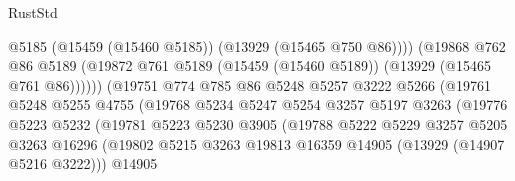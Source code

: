 \begin{lexlean}{RustStd}
\begin{coremodule}
                                          @5185
                                          (@15459 (@15460 @5185))
                                          (@13929 (@15465 @750 @86))))
                                      (@19868
                                        @762
                                        @86
                                        @5189
                                        (@19872
                                          @761
                                          @5189
                                          (@15459 (@15460 @5189))
                                          (@13929 (@15465 @761 @86))))))
                                  (@19751
                                    @774
                                    @785
                                    @86
                                    @5248
                                    @5257
                                    @3222
                                    @5266
                                    (@19761
                                      @5248
                                      @5255
                                      @4755
                                      (@19768
                                        @5234
                                        @5247
                                        @5254
                                        @3257
                                        @5197
                                        @3263
                                        (@19776
                                          @5223
                                          @5232
                                          (@19781
                                            @5223
                                            @5230
                                            @3905
                                            (@19788
                                              @5222
                                              @5229
                                              @3257
                                              @5205
                                              @3263
                                              @16296
                                              (@19802
                                                @5215
                                                @3263
                                                @19813
                                                @16359
                                                @14905
                                                (@13929 (@14907 @5216 @3222)))
                                              @14905

\end{coremodule}
\end{lexlean}
